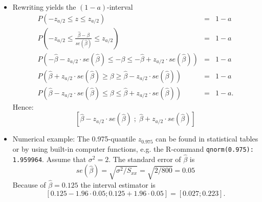 \documentclass{article}
\begin{document}
\begin{itemize}
	\item Rewriting yields the $(1-a)$-interval
\begin{eqnarray*}
	P\left( -z_{a/2}\leq z\leq z_{a/2}\right) &=&1-a \\
	P\left( -z_{a/2}\leq \frac{\hat{\beta}-\beta }{se(\hat{\beta})}\leq z_{a/2}%
	\text{{}}\right) &=&1-a \\
	P\left( -\hat{\beta}-z_{a/2}\cdot se(\hat{\beta})\leq -\beta \leq -\hat{\beta%
	}+z_{a/2}\cdot se(\hat{\beta})\right) &=&1-a \\
	P\left( \hat{\beta}+z_{a/2}\cdot se(\hat{\beta})\geq \beta \geq \hat{\beta}%
	-z_{a/2}\cdot se(\hat{\beta})\right) \text{{}} &=&1-a \\
	P\left( \hat{\beta}-z_{a/2}\cdot se(\hat{\beta})\leq \beta \leq \hat{\beta}%
	+z_{a/2}\cdot se(\hat{\beta})\right) &=&1-a.
\end{eqnarray*}
Hence:
\[
\left[ \hat{\beta}-z_{a/2}\cdot se(\hat{\beta})\;;\;\hat{\beta}+z_{a/2}\cdot
se(\hat{\beta})\right] 
\]
\item Numerical example:
The 0.975-quantile $z_{0.975}$ can be found in statistical tables or by
using built-in computer functions, e.g. the R-command \texttt{qnorm(0.975):
	1.959964}$.$ Assume that $\sigma ^{2}=2$. The standard error of $\hat{\beta}$
is%
\[
se(\hat{\beta})=\sqrt{\sigma ^{2}/S_{xx}}=\sqrt{2/800}=0.05 
\]%
Because of $\hat{\beta}=0.125$ the interval estimator is%
\[
\left[ 0.125-1.96\cdot 0.05;0.125+1.96\cdot 0.05\right] =\left[ 0.027;0.223%
\right] . 
\]

\end{itemize}
\end{document}
